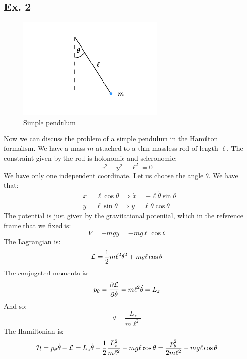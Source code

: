 \subsection{Ex. 2}
\begin{figure}[H]
  \centering
  \includegraphics[width=0.5\linewidth]{res/svg/simple_pendulum.drawio}
  \caption{Simple pendulum}
\end{figure}
Now we can discuss the problem of a simple pendulum in the Hamilton formalism. We have a mass $m$ attached to a thin massless rod of length $\ell$. The constraint given by the rod is holonomic and scleronomic:
\begin{equation}
  x^2+y^2-\ell^2 = 0
\end{equation}
We have only one independent coordinate. Let us choose the angle $\theta$. We have that:
\begin{equation}
  \begin{split}
    &x = \ell \cos \theta \implies \dot{x} = - \ell \dot{\theta}\sin \theta \\[8pt]
    &y = \ell \sin \theta \implies \dot{y} = \ell \dot{\theta}\cos \theta
  \end{split}
\end{equation}
The potential is just given by the gravitational potential, which in the reference frame that we fixed is:
\begin{equation}
  V = -mgy = -mg \ell \cos \theta
\end{equation}
The Lagrangian is:
\begin{equation}
  \mathcal{L} = \dfrac{1}{2}m\ell^2\dot{\theta}^2 + mg \ell \cos \theta
\end{equation}
The conjugated momenta is:
\begin{equation}
  p_{\theta} = \pdv{\lagr}{\dot{\theta}} = m\ell^2\dot{\theta} = L_z
\end{equation}
And so:
\begin{equation}
  \dot{\theta} = \dfrac{L_z}{m\ell^2}
\end{equation}
The Hamiltonian is:
\begin{equation}
  \mathcal{H} = p_{\theta}\dot{\theta} - \mathcal{L} = L_z\dot{\theta} - \dfrac{1}{2}\dfrac{L_z^2}{m\ell^2} - mg \ell \cos \theta = \dfrac{p_{\theta}^2}{2m\ell^2} - mg \ell \cos \theta
\end{equation}
